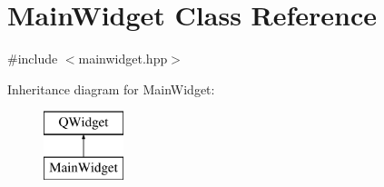 \hypertarget{classMainWidget}{}\section{Main\+Widget Class Reference}
\label{classMainWidget}


{\ttfamily \#include $<$mainwidget.\+hpp$>$}

Inheritance diagram for Main\+Widget\+:\begin{figure}[H]
\begin{center}
\leavevmode
\includegraphics[height=2.000000cm]{classMainWidget}
\end{center}
\end{figure}
